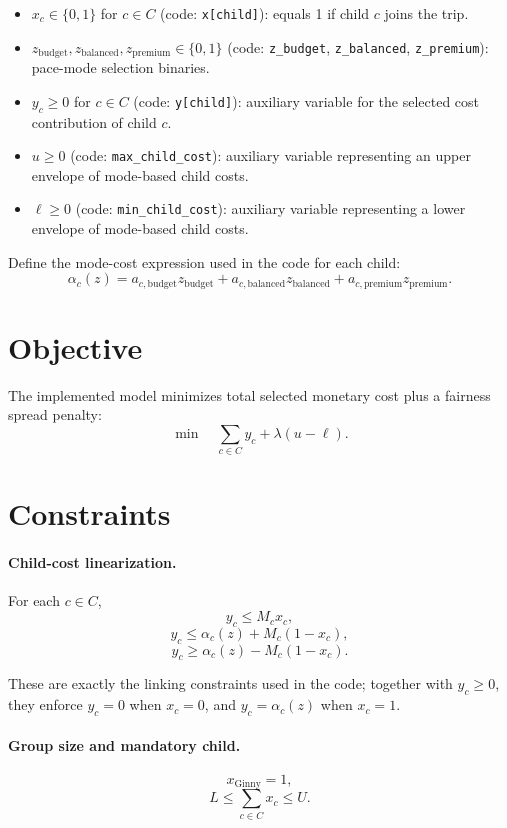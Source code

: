 \begin{itemize}
    \item \(x_c \in \{0,1\}\) for \(c\in C\) (code: \texttt{x[child]}): equals 1 if child \(c\) joins the trip.
    \item \(z_{\text{budget}}, z_{\text{balanced}}, z_{\text{premium}} \in \{0,1\}\) (code: \texttt{z\_budget}, \texttt{z\_balanced}, \texttt{z\_premium}): pace-mode selection binaries.
    \item \(y_c \ge 0\) for \(c\in C\) (code: \texttt{y[child]}): auxiliary variable for the selected cost contribution of child \(c\).
    \item \(u \ge 0\) (code: \texttt{max\_child\_cost}): auxiliary variable representing an upper envelope of mode-based child costs.
    \item \(\ell \ge 0\) (code: \texttt{min\_child\_cost}): auxiliary variable representing a lower envelope of mode-based child costs.
\end{itemize}

Define the mode-cost expression used in the code for each child:
\[
\alpha_c(z)=a_{c,\text{budget}}z_{\text{budget}}+a_{c,\text{balanced}}z_{\text{balanced}}+a_{c,\text{premium}}z_{\text{premium}}.
\]

\section*{Objective}

The implemented model minimizes total selected monetary cost plus a fairness spread penalty:
\[
\min \quad \sum_{c\in C} y_c + \lambda (u-\ell).
\]

\section*{Constraints}

\paragraph{Child-cost linearization.}
For each \(c\in C\),
\[
y_c \le M_c x_c,
\]
\[
y_c \le \alpha_c(z) + M_c(1-x_c),
\]
\[
y_c \ge \alpha_c(z) - M_c(1-x_c).
\]

These are exactly the linking constraints used in the code; together with \(y_c\ge 0\), they enforce \(y_c=0\) when \(x_c=0\), and \(y_c=\alpha_c(z)\) when \(x_c=1\).

\paragraph{Group size and mandatory child.}
\[
x_{\text{Ginny}}=1,
\]
\[
L \le \sum_{c\in C} x_c \le U.
\]

